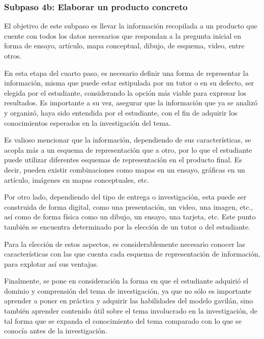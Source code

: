 
\subsubsection{Subpaso 4b: Elaborar un producto concreto}
\label{secPaso4bCap2}

El objetivo de este subpaso es llevar la información recopilada a un producto que cuente con todos los datos necesarios que respondan a la pregunta inicial en forma de ensayo, artículo, mapa conceptual, dibujo, de esquema, video, entre otros.

En esta etapa del cuarto paso, es necesario definir una forma de representar la información, misma que puede estar estipulada por un tutor o en su defecto, ser elegida por el estudiante, considerando la opción más viable para expresar los resultados. Es importante a su vez, asegurar que la información que ya se analizó y organizó, haya sido entendida por el estudiante, con el fin de adquirir los conocimientos esperados en la investigación del tema.

Es valioso mencionar que la información, dependiendo de sus características, se acopla más a un esquema de representación que a otro, por lo que el estudiante puede utilizar diferentes esquemas de representación en el producto final. Es decir, pueden existir combinaciones como mapas en un ensayo, gráficas en un artículo, imágenes en mapas conceptuales, etc.

Por otro lado, dependiendo del tipo de entrega o investigación, esta puede ser construida de forma digital, como una presentación, un video, una imagen, etc., así como de forma física como un dibujo, un ensayo, una tarjeta, etc. Este punto también se encuentra determinado por la elección de un tutor o del estudiante.

Para la elección de estos aspectos, es considerablemente necesario conocer las características con las que cuenta cada esquema de representación de información, para explotar así sus ventajas.

Finalmente, se pone en consideración la forma en que el estudiante adquirió el dominio y comprensión del tema de investigación, ya que no sólo es importante aprender a poner en práctica y adquirir las habilidades del modelo gavilán, sino también aprender contenido útil sobre el tema involucrado en la investigación, de tal forma que se expanda el conocimiento del tema comparado con lo que se conocía antes de la investigación.

